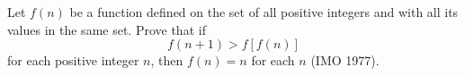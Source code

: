 Let $f(n)$ be a function defined on the set of all positive integers and with all its values in the same set. Prove that if
\[ f(n + 1) > f[f(n)] \]
for each positive integer $n$, then $f(n) = n$ for each $n$ (IMO 1977).
